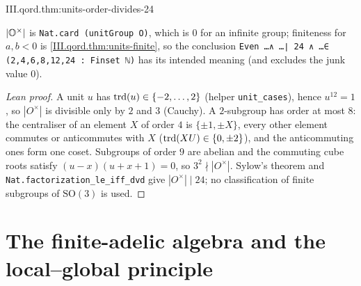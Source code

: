 \begin{theorem}
\end{theorem}
\begin{tfformal}{III.qord.thm:units-order-divides-24}
\begin{tffidelity}
$\lvert\mathbb{O}^\times\rvert$ is \texttt{Nat.card (unitGroup O)}, which is $0$ for an infinite group; finiteness for $a,b<0$ is \cref{III.qord.thm:units-finite}, so the conclusion \texttt{Even \dots ∧ \dots ∣ 24 ∧ \dots ∈ ({2,4,6,8,12,24} : Finset ℕ)} has its intended meaning (and excludes the junk value $0$).
\end{tffidelity}
\end{tfformal}
\begin{proof}[Lean proof]
A unit $u$ has $\operatorname{trd}(u)\in\{-2,\dots,2\}$ (helper \texttt{unit\_cases}), hence $u^{12}=1$, so $|O^\times|$ is divisible only by $2$ and $3$ (Cauchy). A $2$-subgroup has order at most $8$: the centraliser of an element $X$ of order $4$ is $\{\pm1,\pm X\}$, every other element commutes or anticommutes with $X$ ($\operatorname{trd}(XU)\in\{0,\pm2\}$), and the anticommuting ones form one coset. Subgroups of order $9$ are abelian and the commuting cube roots satisfy $(u-x)(u+x+1)=0$, so $3^2\nmid|O^\times|$. Sylow's theorem and \texttt{Nat.factorization\_le\_iff\_dvd} give $|O^\times|\mid 24$; no classification of finite subgroups of $\mathrm{SO}(3)$ is used.
\end{proof}


\section{The finite-adelic algebra and the local--global principle}\label{sec:qcls-adelic}

